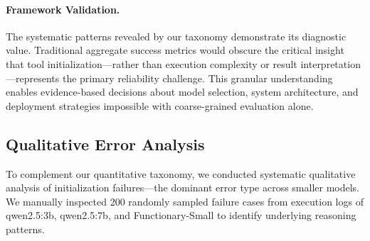 \documentclass[conference]{IEEEtran}
\begin{document}


\paragraph{Framework Validation.}
The systematic patterns revealed by our taxonomy demonstrate its diagnostic value. Traditional aggregate success metrics would obscure the critical insight that tool initialization—rather than execution complexity or result interpretation—represents the primary reliability challenge. This granular understanding enables evidence-based decisions about model selection, system architecture, and deployment strategies impossible with coarse-grained evaluation alone.

\subsection{Qualitative Error Analysis}
\label{sec:qualitative_analysis}

To complement our quantitative taxonomy, we conducted systematic qualitative analysis of initialization failures—the dominant error type across smaller models. We manually inspected 200 randomly sampled failure cases from execution logs of qwen2.5:3b, qwen2.5:7b, and Functionary-Small to identify underlying reasoning patterns.
\end{document}
